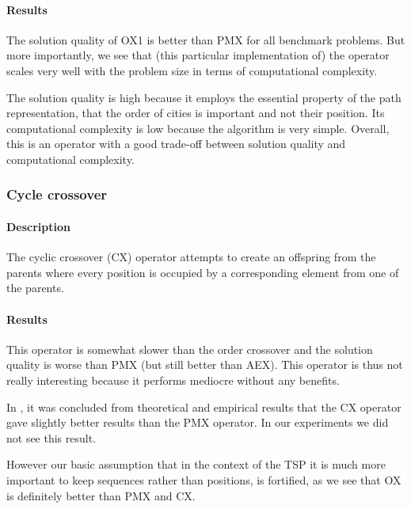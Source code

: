 \documentclass[a4paper,english,11pt,]{scrartcl}
\begin{document}
\paragraph{Results}
The solution quality of OX1 is better than PMX for all benchmark problems. But more importantly, we see that (this particular implementation of) the operator scales very well with the problem size in terms of computational complexity. 

The solution quality is high because it employs the essential property of the path representation, that the order of cities is important and not their position. Its computational complexity is low because the algorithm is very simple. Overall, this is an operator with a good trade-off between solution quality and computational complexity.
% 

\subsubsection{Cycle crossover}

\paragraph{Description}
The cyclic crossover (CX) operator attempts to create an offspring from the parents where every position is
occupied by a corresponding element from one of the parents.


\paragraph{Results}
This operator is somewhat slower than the order crossover and the solution quality is worse than PMX (but still better than AEX). This operator is thus not really interesting because it performs mediocre without any benefits.

In \cite{Oliver}, it was concluded from theoretical and empirical results
that the CX operator gave slightly better results than the PMX operator. 
In our experiments we did not see this result.

However our basic assumption that in the context of the TSP it is much more
important to keep sequences rather than positions, is fortified, as we see that OX is definitely better than PMX and CX.
\end{document}
